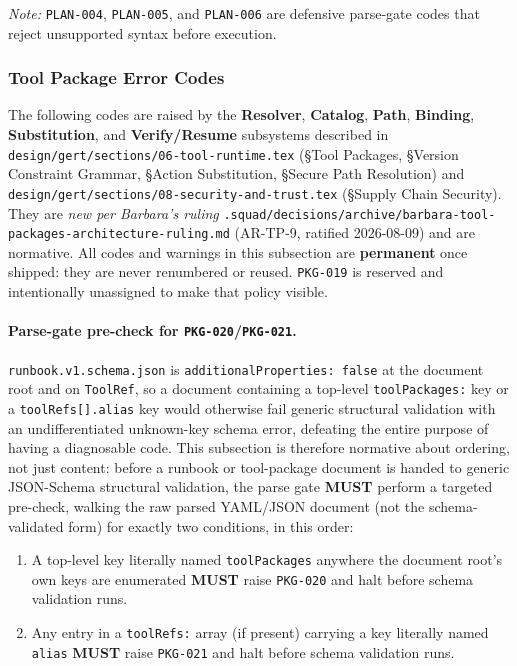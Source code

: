 \noindent\textit{Note:} \texttt{PLAN-004}, \texttt{PLAN-005}, and
\texttt{PLAN-006} are defensive parse-gate codes that reject unsupported
syntax before execution.

\subsubsection{Tool Package Error Codes}
\label{sec:parse-gate:error-codes:pkg}

The following codes are raised by the \textbf{Resolver}, \textbf{Catalog},
\textbf{Path}, \textbf{Binding}, \textbf{Substitution}, and
\textbf{Verify/Resume} subsystems described in
\texttt{design/gert/sections/06-tool-runtime.tex} (\S Tool Packages,
\S Version Constraint Grammar, \S Action Substitution, \S Secure Path
Resolution) and \texttt{design/gert/sections/08-security-and-trust.tex}
(\S Supply Chain Security). They are \emph{new per Barbara's ruling}
\texttt{.squad/decisions/archive/barbara-tool-packages-architecture-ruling.md}
(AR-TP-9, ratified 2026-08-09) and are normative. All codes and warnings in
this subsection are \textbf{permanent} once shipped: they are never
renumbered or reused. \texttt{PKG-019} is reserved and intentionally
unassigned to make that policy visible.

\paragraph{Parse-gate pre-check for \texttt{PKG-020}/\texttt{PKG-021}.}
\texttt{runbook.v1.schema.json} is \texttt{additionalProperties: false} at
the document root and on \texttt{ToolRef}, so a document containing a
top-level \texttt{toolPackages:} key or a \texttt{toolRefs[].alias} key
would otherwise fail generic structural validation with an undifferentiated
unknown-key schema error, defeating the entire purpose of having a
diagnosable code. This subsection is therefore normative about ordering,
not just content: before a runbook or tool-package document is handed to
generic JSON-Schema structural validation, the parse gate \textbf{MUST}
perform a targeted pre-check, walking the raw parsed YAML/JSON document
(not the schema-validated form) for exactly two conditions, in this order:

\begin{enumerate}
  \item A top-level key literally named \texttt{toolPackages} anywhere the
        document root's own keys are enumerated \textbf{MUST} raise
        \texttt{PKG-020} and halt before schema validation runs.
  \item Any entry in a \texttt{toolRefs:} array (if present) carrying a key
        literally named \texttt{alias} \textbf{MUST} raise \texttt{PKG-021}
        and halt before schema validation runs.
\end{enumerate}

